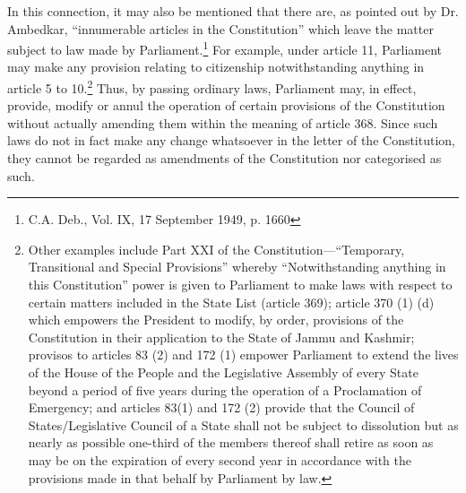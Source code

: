 \begin{multicols}{2}
\noi
In this connection, it may also be mentioned that there are, as pointed out by Dr. Ambedkar,
“innumerable articles in the Constitution” which leave the matter subject to law made by
Parliament.\footnote{C.A. Deb., Vol. IX, 17 September 1949, p. 1660} For example, under article 11, Parliament may make any provision relating to
citizenship notwithstanding anything in article 5 to 10.\footnote{Other examples include Part XXI of the Constitution—“Temporary, Transitional and Special Provisions” whereby “Notwithstanding anything in this Constitution” power is given to Parliament to make laws with respect to certain matters included in the State List (article 369); article 370 (1) (d) which empowers the President to modify, by order, provisions of the Constitution in their application to the State of Jammu and Kashmir; provisos to articles 83 (2) and 172 (1) empower Parliament to extend the lives of the House of the People and the Legislative
Assembly of every State beyond a period of five years during the operation of a Proclamation of Emergency; and
articles 83(1) and 172 (2) provide that the Council of States/Legislative Council of a State shall not be subject to
dissolution but as nearly as possible one-third of the members thereof shall retire as soon as may be on the
expiration of every second year in accordance with the provisions made in that behalf by Parliament by law.} Thus, by passing ordinary laws,
Parliament may, in effect, provide, modify or annul the operation of certain provisions of the
Constitution without actually amending them within the meaning of article 368. Since such
laws do not in fact make any change whatsoever in the letter of the Constitution, they cannot
be regarded as amendments of the Constitution nor categorised as such.


\end{multicols}
